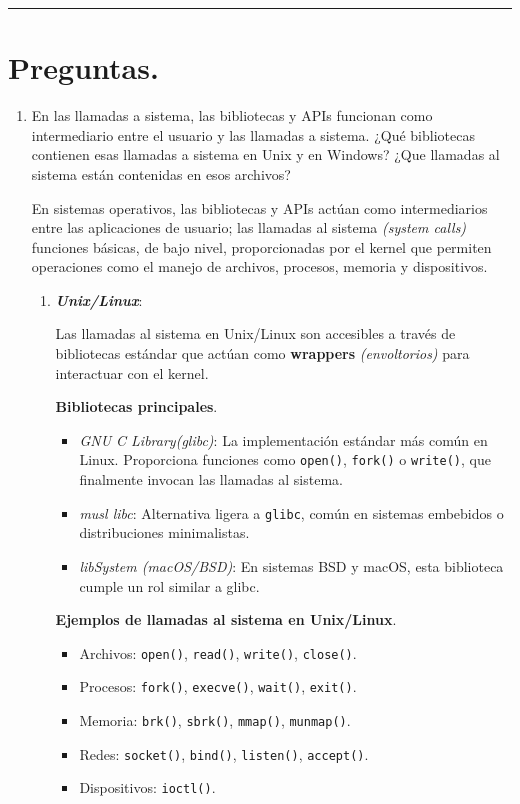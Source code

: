 \documentclass[12pt,letterpaper]{article}
\begin{document}
\bigskip
\hrule height 0.1pt
\bigskip

\section*{Preguntas.}

\begin{enumerate}
\item En las llamadas a sistema, las bibliotecas y APIs funcionan como intermediario entre el usuario y las llamadas a sistema. ¿Qué bibliotecas contienen esas llamadas a sistema en Unix y en Windows? ¿Que llamadas al sistema están contenidas en esos archivos?
  
  \medskip
  
  En sistemas operativos, las bibliotecas y APIs actúan como intermediarios entre las aplicaciones de usuario; las llamadas al sistema \textit{(system calls)} funciones básicas, de bajo nivel, proporcionadas por el kernel que permiten operaciones como el  manejo de archivos, procesos, memoria y dispositivos.

  \begin{enumerate}[label=\arabic*)]
  \item \textit{\textbf{Unix/Linux}}:
    
    Las llamadas al sistema en Unix/Linux son accesibles a través de bibliotecas estándar que actúan como \textbf{wrappers} \textit{(envoltorios)} para interactuar con el kernel.
    
    \textbf{Bibliotecas principales}.
    \begin{itemize}
      \item \textit{GNU C Library(glibc)}: La implementación estándar más común en Linux. Proporciona funciones como \texttt{open()}, \texttt{fork()} o \texttt{write()}, que finalmente invocan las llamadas al sistema.
      \item \textit{musl libc}: Alternativa ligera a \texttt{glibc}, común en sistemas embebidos o distribuciones minimalistas.    
      \item \textit{libSystem (macOS/BSD)}: En sistemas BSD y macOS, esta biblioteca cumple un rol similar a glibc.       
    \end{itemize}

    \textbf{Ejemplos de llamadas al sistema en Unix/Linux}.
    \begin{itemize}
    \item Archivos: \texttt{open()}, \texttt{read()}, \texttt{write()}, \texttt{close()}.
    \item Procesos: \texttt{fork()}, \texttt{execve()}, \texttt{wait()}, \texttt{exit()}.
    \item Memoria: \texttt{brk()}, \texttt{sbrk()}, \texttt{mmap()}, \texttt{munmap()}.
    \item Redes: \texttt{socket()}, \texttt{bind()}, \texttt{listen()}, \texttt{accept()}.
    \item Dispositivos: \texttt{ioctl()}.
    \end{itemize}


\end{enumerate}
\end{enumerate}
\end{document}
